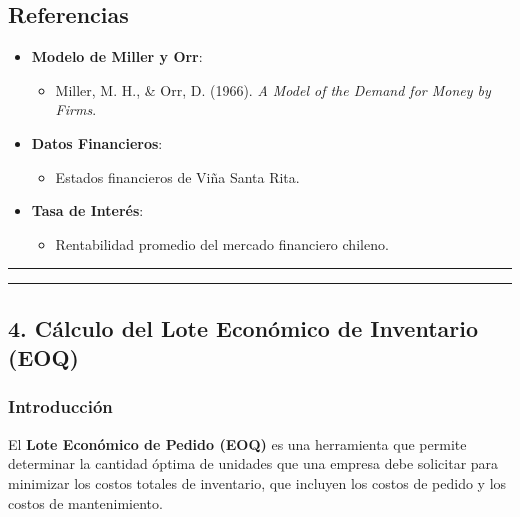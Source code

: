 \documentclass[
  letterpaper,
  DIV=11,
  numbers=noendperiod]{scrartcl}
\providecommand{\tightlist}{%
  \setlength{\itemsep}{0pt}\setlength{\parskip}{0pt}}\usepackage{longtable,booktabs,array}
\begin{document}
\subsection{Referencias}\label{referencias-1}

\begin{itemize}
\tightlist
\item
  \textbf{Modelo de Miller y Orr}:

  \begin{itemize}
  \tightlist
  \item
    Miller, M. H., \& Orr, D. (1966). \emph{A Model of the Demand for
    Money by Firms}.
  \end{itemize}
\item
  \textbf{Datos Financieros}:

  \begin{itemize}
  \tightlist
  \item
    Estados financieros de Viña Santa Rita.
  \end{itemize}
\item
  \textbf{Tasa de Interés}:

  \begin{itemize}
  \tightlist
  \item
    Rentabilidad promedio del mercado financiero chileno.
  \end{itemize}
\end{itemize}

\begin{center}\rule{0.5\linewidth}{0.5pt}\end{center}

\begin{center}\rule{0.5\linewidth}{0.5pt}\end{center}

\subsection{4. Cálculo del Lote Económico de Inventario
(EOQ)}\label{cuxe1lculo-del-lote-econuxf3mico-de-inventario-eoq}

\subsubsection{Introducción}\label{introducciuxf3n}

El \textbf{Lote Económico de Pedido (EOQ)} es una herramienta que
permite determinar la cantidad óptima de unidades que una empresa debe
solicitar para minimizar los costos totales de inventario, que incluyen
los costos de pedido y los costos de mantenimiento.
\end{document}
